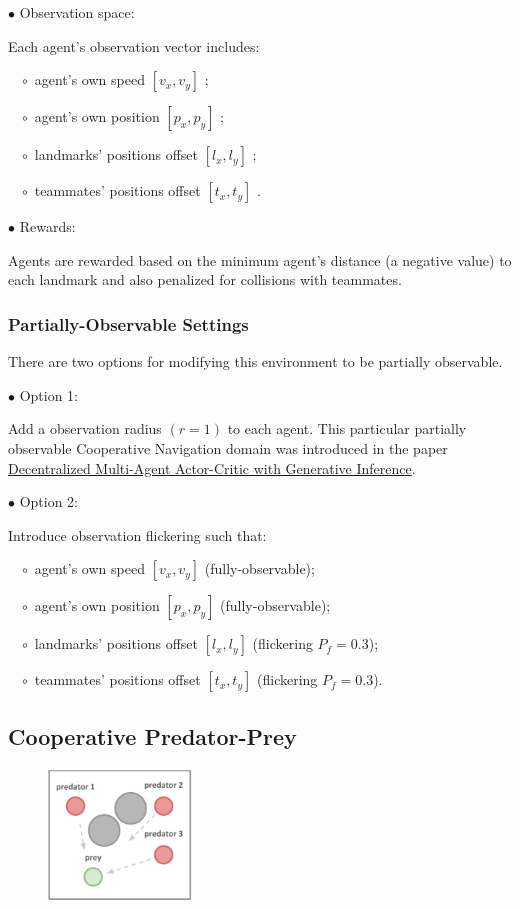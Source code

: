 \documentclass{article}
\begin{document}
$\bullet$ Observation space: 

Each agent's observation vector includes:

$\,\,\,\,\,\circ$ agent's own speed $[v_x, v_y]$ ;

$\,\,\,\,\,\circ$ agent's own position $[p_x, p_y]$ ;

$\,\,\,\,\,\circ$ landmarks' positions offset $[l_x, l_y]$ ;

$\,\,\,\,\,\circ$ teammates' positions offset $[t_x, t_y]$ .

$\bullet$ Rewards: 

Agents are rewarded based on the minimum agent's distance (a negative value) to each landmark and also penalized for collisions with teammates.

\subsubsection{Partially-Observable Settings}

There are two options for modifying this environment to be partially observable.

$\bullet$ Option 1: 

Add a observation radius $(r=1)$ to each agent. This particular partially observable Cooperative Navigation domain was introduced in the paper \href{http://aaai-rlg.mlanctot.info/papers/AAAI20-RLG_paper_15.pdf}{Decentralized Multi-Agent Actor-Critic with Generative Inference}.

$\bullet$ Option 2:

Introduce observation flickering such that:

$\,\,\,\,\,\circ$ agent's own speed $[v_x, v_y]$ (fully-observable);

$\,\,\,\,\,\circ$ agent's own position $[p_x, p_y]$ (fully-observable);

$\,\,\,\,\,\circ$ landmarks' positions offset $[l_x, l_y]$ (flickering $P_f=0.3$);

$\,\,\,\,\,\circ$ teammates' positions offset $[t_x, t_y]$ (flickering $P_f=0.3$).

\subsection{Cooperative Predator-Prey}

\begin{figure}[h!]
    \centering
    \includegraphics[height=3.5cm]{tag.png}
\end{figure}
\end{document}
